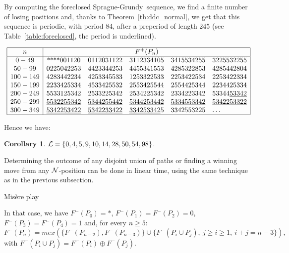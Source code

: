 \documentclass[11pt]{article}
\newcommand{\centre}[1]{\begin{center}#1\end{center}}
\newcommand{\SP}{Sprague-Grundy}
\newcommand{\nimsum}{\oplus}
\newcommand{\NN}{{\cal N}}
\newcommand{\LL}{{\cal L}}
\newtheorem{corollary}[theorem]{Corollary}
\begin{document}
By computing the foreclosed \SP\ sequence, we find a finite number of losing positions and,
thanks to Theorem~\ref{th:ddc_normal}, we get that this sequence is periodic, with period 84, after
a preperiod of length 245 (see Table~\ref{table:foreclosed}, the period is underlined).

\begin{table}
$$\begin{array}{|c|ccccl|}
\hline
n & \multicolumn{5}{c|}{F^+(P_n)} \\
\hline
0-49 & \mbox{\small ****}001120 & 0112031122 & 3112334105 & 3415534255 & 3225532255 \\
50-99 & 0225042253 & 4423344253 & 4455341553 & 4285322853 & 4285442804 \\
100-149 & 4283442234 & 4253345533 & 1253322533 & 2253422534 & 2253422334 \\
150-199 & 2233425334 & 4533425532 & 2553425544 & 2554425344 & 2234425334 \\
200-249 & 5533125342 & 2533225342 & 2534225342 & 2334223342 & 53344\underline{53342}  \\
250-299 & \underline{5532255342} & \underline{5344255442} & \underline{5344253442} & 
   \underline{5334553342} & \underline{5342253322} \\
300-349 & \underline{5342253422} & \underline{5342233422} & 
    \underline{334253342}5 & 3342553225 & \dots \\
\hline
\end{array}$$
\caption{\label{table:foreclosed}
The foreclosed \SP\ sequence under normal play}
\end{table}

Hence we have:

\begin{corollary}
$\LL=\{0,4,5,9,10,14,28,50,54,98\}$.
\end{corollary}

Determining the outcome of any disjoint union of paths or finding
a winning move from any $\NN$-position can be done in linear time,
using the same technique as in the previous subsection.

\vskip 4mm

\centre{{\sc Mis\`ere play}}

In that case, we have $F^-(P_0)=*$,
$F^-(P_1)=F^-(P_2)=0$,
$F^-(P_3)=F^-(P_4)=1$ and, for every $n\ge 5$:
$$F^-(P_n)=mex(\{F^-(P_{n-2}),F^-(P_{n-3})\}\cup
\{F^-(P_i\cup P_j),\ j\ge i\ge 1,\ i+j=n-3\}),$$
with $F^-(P_i\cup P_j)=F^-(P_i)\nimsum F^-(P_j)$.
\end{document}
